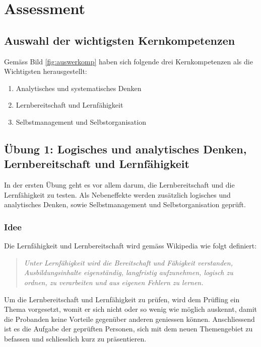 \chapter{Assessment}\label{Assessment}

\section{Auswahl der wichtigsten Kernkompetenzen}

Gemäss Bild \ref{fig:auswerkomp} haben sich folgende drei Kernkompetenzen als die Wichtigsten herausgestellt:

\begin{enumerate} 
\item{Analytisches und systematisches Denken}
\item{Lernbereitschaft und Lernfähigkeit}
\item{Selbstmanagement und Selbstorganisation}
\end{enumerate}

\section{Übung 1: Logisches und analytisches Denken, Lernbereitschaft und Lernfähigkeit}

In der ersten Übung geht es vor allem darum, die Lernbereitschaft und die Lernfähigkeit zu testen. Als Nebeneffekte werden zusätzlich logisches und analytisches Denken, sowie Selbstmanagement und Selbstorganisation geprüft.

\subsection{Idee}

Die Lernfähigkeit und Lernbereitschaft wird gemäss Wikipedia \cite{wiki:Lernfahigkeit} wie folgt definiert:
\begin{quote} 
\textit{Unter Lernfähigkeit wird die Bereitschaft und Fähigkeit verstanden, Ausbildungsinhalte eigenständig, langfristig aufzunehmen, logisch zu ordnen, zu verarbeiten und aus eigenen Fehlern zu lernen.}
\end{quote}

Um die Lernbereitschaft und Lernfähigkeit zu prüfen, wird dem Prüfling ein Thema vorgesetzt, womit er sich nicht oder so wenig wie möglich auskennt, damit die Probanden keine Vorteile gegenüber anderen geniessen können. Anschliessend ist es die Aufgabe der geprüften Personen, sich mit dem neuen Themengebiet zu befassen und schliesslich kurz zu präsentieren.

